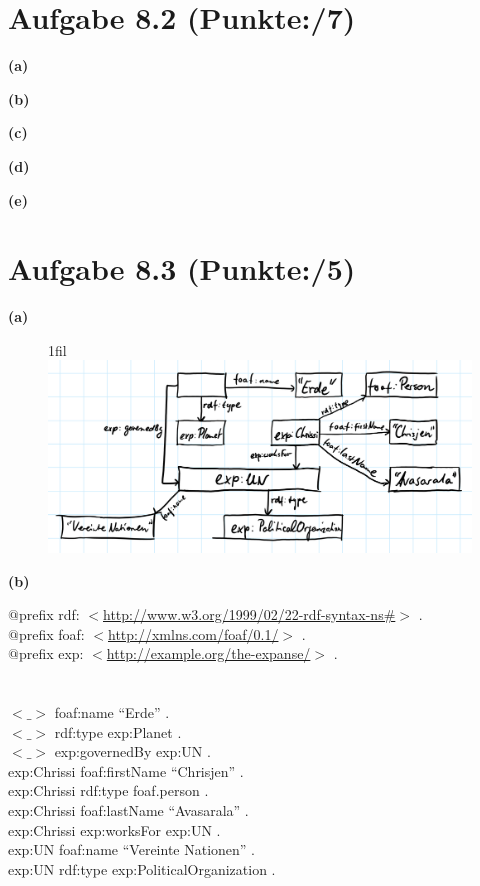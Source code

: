 \documentclass[11pt, a4paper]{article}
\makeatletter
\newcommand{\blattnummer}{8}
\newcommand{\pp}{7}
\newcommand{\ppp}{5}
\newcommand*{\centerfloat}{%
  \parindent \z@
  \leftskip \z@ \@plus 1fil \@minus \textwidth
  \rightskip\leftskip
  \parfillskip \z@skip}
\newcommand{\aufgabe}[2] {\section*{Aufgabe \blattnummer.#1 (Punkte:\qquad/#2)}}
\newcommand{\aufgabenteil}[1] {\textbf{(#1)}}
\makeatother
\begin{document}
\aufgabe{2}{\pp}
\aufgabenteil{a}
\begin{adjustwidth}{20pt}{20pt}

\end{adjustwidth}
\aufgabenteil{b}
\begin{adjustwidth}{20pt}{20pt}

\end{adjustwidth}
\aufgabenteil{c}
\begin{adjustwidth}{20pt}{20pt}

\end{adjustwidth}
\aufgabenteil{d}
\begin{adjustwidth}{20pt}{20pt}

\end{adjustwidth}
\aufgabenteil{e}
\begin{adjustwidth}{20pt}{20pt}

\end{adjustwidth}



\aufgabe{3}{\ppp}
\aufgabenteil{a}
\begin{figure}[h]
\centerfloat
\includegraphics[page=1,scale=0.5]{u08-3-a.png}
\end{figure}
\newpage
\aufgabenteil{b}
\begin{adjustwidth}{20pt}{20pt}
$@$prefix rdf: $<$\url{http://www.w3.org/1999/02/22-rdf-syntax-ns\#}$>$ .\\
$@$prefix foaf: $<$\url{http://xmlns.com/foaf/0.1/}$>$ .\\
$@$prefix exp: $<$\url{http://example.org/the-expanse/}$>$ .\\
\\ \ \\
$<\_>$ foaf:name ``Erde'' .\\
$<\_>$ rdf:type exp:Planet .\\
$<\_>$ exp:governedBy exp:UN .\\
exp:Chrissi foaf:firstName ``Chrisjen'' .\\
exp:Chrissi rdf:type foaf.person .\\
exp:Chrissi foaf:lastName ``Avasarala'' .\\
exp:Chrissi exp:worksFor exp:UN .\\
exp:UN foaf:name ``Vereinte Nationen'' .\\
exp:UN rdf:type exp:PoliticalOrganization .\\
\end{adjustwidth}

\end{document}
